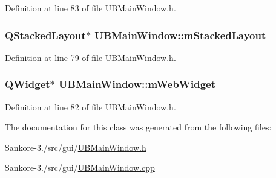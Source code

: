 Definition at line 83 of file U\-B\-Main\-Window.\-h.

\hypertarget{class_u_b_main_window_a2c37b6336535a741661bbeb7e1375d8e}{
\subsubsection[{m\-Stacked\-Layout}]{\setlength{\rightskip}{0pt plus 5cm}Q\-Stacked\-Layout$\ast$ U\-B\-Main\-Window\-::m\-Stacked\-Layout\hspace{0.3cm}{\ttfamily [protected]}}}\label{d8/d9e/class_u_b_main_window_a2c37b6336535a741661bbeb7e1375d8e}


Definition at line 79 of file U\-B\-Main\-Window.\-h.

\hypertarget{class_u_b_main_window_a795096ff1d8e22ced78502c36a540eea}{
\subsubsection[{m\-Web\-Widget}]{\setlength{\rightskip}{0pt plus 5cm}Q\-Widget$\ast$ U\-B\-Main\-Window\-::m\-Web\-Widget\hspace{0.3cm}{\ttfamily [protected]}}}\label{d8/d9e/class_u_b_main_window_a795096ff1d8e22ced78502c36a540eea}


Definition at line 82 of file U\-B\-Main\-Window.\-h.



The documentation for this class was generated from the following files\-:\begin{DoxyCompactItemize}
\item 
Sankore-\/3./src/gui/\hyperlink{_u_b_main_window_8h}{U\-B\-Main\-Window.\-h}\item 
Sankore-\/3./src/gui/\hyperlink{_u_b_main_window_8cpp}{U\-B\-Main\-Window.\-cpp}\end{DoxyCompactItemize}
